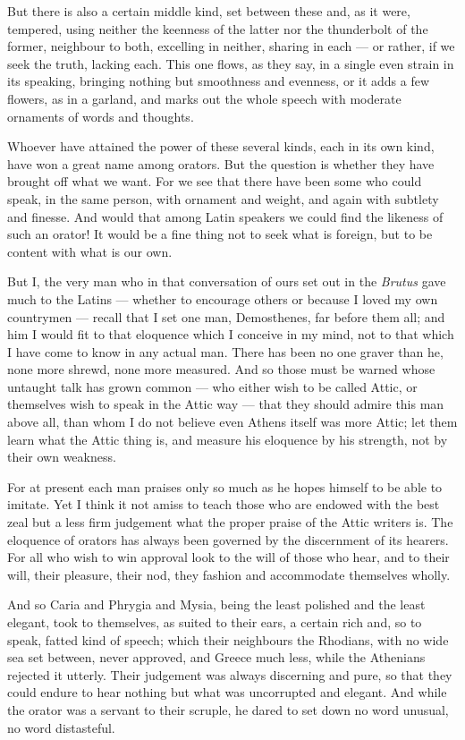  But there is also a certain middle kind, set between these and, as it were, tempered, using neither the keenness of the latter nor the thunderbolt of the former, neighbour to both, excelling in neither, sharing in each — or rather, if we seek the truth, lacking each. This one flows, as they say, in a single even strain in its speaking, bringing nothing but smoothness and evenness, or it adds a few flowers, as in a garland, and marks out the whole speech with moderate ornaments of words and thoughts.

 Whoever have attained the power of these several kinds, each in its own kind, have won a great name among orators. But the question is whether they have brought off what we want. For we see that there have been some who could speak, in the same person, with ornament and weight, and again with subtlety and finesse. And would that among Latin speakers we could find the likeness of such an orator! It would be a fine thing not to seek what is foreign, but to be content with what is our own.

 But I, the very man who in that conversation of ours set out in the \textit{Brutus} gave much to the Latins — whether to encourage others or because I loved my own countrymen — recall that I set one man, Demosthenes, far before them all; and him I would fit to that eloquence which I conceive in my mind, not to that which I have come to know in any actual man. There has been no one graver than he, none more shrewd, none more measured. And so those must be warned whose untaught talk has grown common — who either wish to be called Attic, or themselves wish to speak in the Attic way — that they should admire this man above all, than whom I do not believe even Athens itself was more Attic; let them learn what the Attic thing is, and measure his eloquence by his strength, not by their own weakness.

 For at present each man praises only so much as he hopes himself to be able to imitate. Yet I think it not amiss to teach those who are endowed with the best zeal but a less firm judgement what the proper praise of the Attic writers is. The eloquence of orators has always been governed by the discernment of its hearers. For all who wish to win approval look to the will of those who hear, and to their will, their pleasure, their nod, they fashion and accommodate themselves wholly.

 And so Caria and Phrygia and Mysia, being the least polished and the least elegant, took to themselves, as suited to their ears, a certain rich and, so to speak, fatted kind of speech; which their neighbours the Rhodians, with no wide sea set between, never approved, and Greece much less, while the Athenians rejected it utterly. Their judgement was always discerning and pure, so that they could endure to hear nothing but what was uncorrupted and elegant. And while the orator was a servant to their scruple, he dared to set down no word unusual, no word distasteful.

